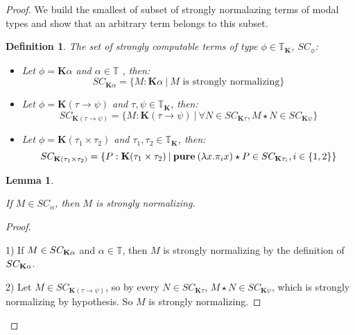 \documentclass[a4paper]{article}
\newtheorem{lemma}{Lemma}
\newtheorem{defin}{Definition}
\begin{document}
  \begin{proof}

  We build the smallest of subset of strongly normalazing terms of modal types and show that an arbitrary
  term belongs to this subset.

  \begin{defin} The set of strongly computable terms of type $\phi \in \mathbb{T}_{\textbf{K}}$, $SC_{\phi}$:

  \begin{itemize}
  \item Let $\phi = \textbf{K}\alpha$ and $\alpha \in \mathbb{T}$ , then:
  \begin{equation}
  SC_{\textbf{K}\alpha} = \{ M : \textbf{K}\alpha \: | \: \text{$M$ is strongly normalizing} \}
  \end{equation}

  \item Let $\phi = \textbf{K}(\tau \to \psi)$ and $\tau, \psi \in \mathbb{T}_{\textbf{K}}$, then:
  \begin{equation}
  SC_{\textbf{K}(\tau \to \psi)} = \{ M : \textbf{K}(\tau \to \psi) \: | \: \forall N \in SC_{\textbf{K}\tau}, M \star N \in SC_{\textbf{K}\psi}\}
  \end{equation}

  \item Let $\phi = \textbf{K}(\tau_1 \times \tau_2)$ and $\tau_1, \tau_2 \in \mathbb{T}_{\textbf{K}}$, then:
  \begin{equation}
  SC_{\textbf{K}(\tau_1 \times \tau_2)} = \{ P : \textbf{K}(\tau_1 \times \tau_2) \: |
  \: {\bf pure \:} (\lambda x. \pi_i x) \star P \in SC_{\textbf{K}\tau_i}, i \in \{1,2\} \}
  \end{equation}
  \end{itemize}
  \end{defin}

  \begin{lemma}

  $ $

  If $M \in SC_{\alpha}$, then $M$ is strongly normalizing.

  \end{lemma}

  \begin{proof}

$ $

  1) If $M \in SC_{{\bf K} \alpha}$ and $\alpha \in \mathbb{T}$, then $M$ is strongly normalizing by the
  definition of $SC_{{\bf K} \alpha}$.

  2) Let $M \in SC_{\textbf{K}(\tau \to \psi)}$, so by every $N \in SC_{\textbf{K}\tau}$,
  $M \star N \in SC_{\textbf{K}\psi}$, which is strongly normalizing by hypothesis. So $M$ is
  strongly normalizing.


\end{proof}
\end{proof}
\end{document}
